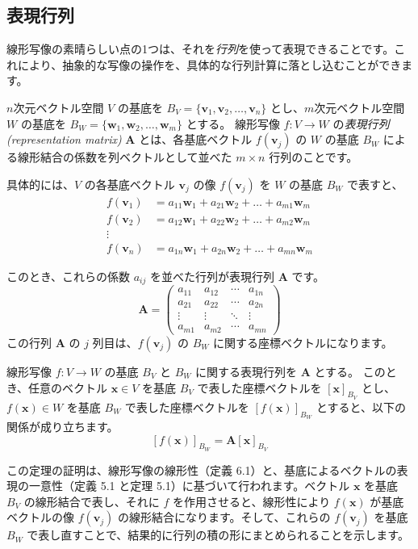 \subsection{表現行列}
線形写像の素晴らしい点の1つは、それを\emph{行列}を使って表現できることです。これにより、抽象的な写像の操作を、具体的な行列計算に落とし込むことができます。

\begin{dfn}[表現行列]
$n$次元ベクトル空間 $V$ の基底を $B_V = \{\bm{v}_1, \bm{v}_2, \ldots, \bm{v}_n\}$ とし、$m$次元ベクトル空間 $W$ の基底を $B_W = \{\bm{w}_1, \bm{w}_2, \ldots, \bm{w}_m\}$ とする。
線形写像 $f: V \to W$ の\emph{表現行列 (representation matrix)} $\bm{A}$ とは、各基底ベクトル $f(\bm{v}_j)$ の $W$ の基底 $B_W$ による線形結合の係数を列ベクトルとして並べた $m \times n$ 行列のことです。
\end{dfn}

具体的には、$V$ の各基底ベクトル $\bm{v}_j$ の像 $f(\bm{v}_j)$ を $W$ の基底 $B_W$ で表すと、
\begin{align*}
f(\bm{v}_1) &= a_{11}\bm{w}_1 + a_{21}\bm{w}_2 + \dots + a_{m1}\bm{w}_m\\
f(\bm{v}_2) &= a_{12}\bm{w}_1 + a_{22}\bm{w}_2 + \dots + a_{m2}\bm{w}_m\\
\vdots \\
f(\bm{v}_n) &= a_{1n}\bm{w}_1 + a_{2n}\bm{w}_2 + \dots + a_{mn}\bm{w}_m
\end{align*}

このとき、これらの係数 $a_{ij}$ を並べた行列が表現行列 $\bm{A}$ です。
\[
\bm{A} = \begin{pmatrix}
a_{11} & a_{12} & \cdots & a_{1n} \\
a_{21} & a_{22} & \cdots & a_{2n} \\
\vdots & \vdots & \ddots & \vdots \\
a_{m1} & a_{m2} & \cdots & a_{mn}
\end{pmatrix}
\]
この行列 $\bm{A}$ の $j$ 列目は、$f(\bm{v}_j)$ の $B_W$ に関する座標ベクトルになります。

\begin{thm}[線形写像の行列による表現]
線形写像 $f: V \to W$ の基底 $B_V$ と $B_W$ に関する表現行列を $\bm{A}$ とする。
このとき、任意のベクトル $\bm{x} \in V$ を基底 $B_V$ で表した座標ベクトルを $[\bm{x}]_{B_V}$ とし、$f(\bm{x}) \in W$ を基底 $B_W$ で表した座標ベクトルを $[f(\bm{x})]_{B_W}$ とすると、以下の関係が成り立ちます。
\[[f(\bm{x})]_{B_W} = \bm{A} [\bm{x}]_{B_V}\]
\begin{proof*}[アイデア]
この定理の証明は、線形写像の線形性（定義 6.1）と、基底によるベクトルの表現の一意性（定義 5.1 と定理 5.1）に基づいて行われます。ベクトル $\bm{x}$ を基底 $B_V$ の線形結合で表し、それに $f$ を作用させると、線形性により $f(\bm{x})$ が基底ベクトルの像 $f(\bm{v}_j)$ の線形結合になります。そして、これらの $f(\bm{v}_j)$ を基底 $B_W$ で表し直すことで、結果的に行列の積の形にまとめられることを示します。
\end{proof*}
\end{thm}

